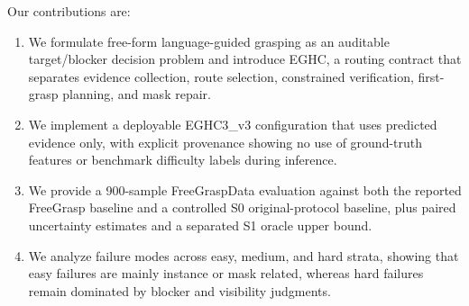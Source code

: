 Our contributions are:
\begin{enumerate}
    \item We formulate free-form language-guided grasping as an auditable target/blocker decision problem and introduce EGHC, a routing contract that separates evidence collection, route selection, constrained verification, first-grasp planning, and mask repair.
    \item We implement a deployable EGHC3\_v3 configuration that uses predicted evidence only, with explicit provenance showing no use of ground-truth features or benchmark difficulty labels during inference.
    \item We provide a 900-sample FreeGraspData evaluation against both the reported FreeGrasp baseline and a controlled S0 original-protocol baseline, plus paired uncertainty estimates and a separated S1 oracle upper bound.
    \item We analyze failure modes across easy, medium, and hard strata, showing that easy failures are mainly instance or mask related, whereas hard failures remain dominated by blocker and visibility judgments.
\end{enumerate}
